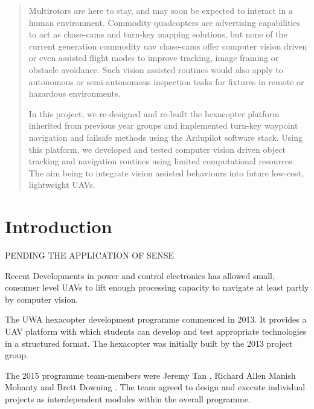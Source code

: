 \documentclass{article}
\begin{document}
  

  \begin{abstract}
  Multirotors are here to stay, and may soon be expected to interact in a human environment.
  Commodity quadcopters are advertising capabilities to act as  chase-cams and turn-key mapping solutions, but none of the current generation commodity uav chase-cams offer computer vision driven or even assisted flight modes to improve tracking, image framing or obstacle avoidance.  Such vision assisted routines would also apply to autonomous or semi-autonomous inspection tasks for fixtures in remote or hazardous environments.

  In this project, we re-designed and re-built the hexacopter platform inherited from previous year groups and implemented turn-key waypoint navigation and failsafe methods using the Ardupilot software stack.
  Using this platform, we developed and tested computer vision driven object tracking and navigation routines using limited computational resources. The aim  being to integrate vision assisted behaviours into future low-cost, lightweight UAVs.
  \end{abstract}
  \pagebreak
  \tableofcontents
  \pagebreak
  \section{Introduction}
    PENDING THE APPLICATION OF SENSE
    
    Recent Developments in power and control electronics has allowed small, consumer level UAVs to lift enough processing capacity to navigate at least partly by computer vision.
    
    The UWA hexacopter development programme commenced in 2013. It provides a UAV platform with which students can develop and test appropriate technologies in a structured format. The hexacopter was initially built by the 2013 project group.


    The 2015 programme team-members were Jeremy Tan \cite{Tan}, Richard Allen \cite{Allen} Manish Mohanty \cite{Mohanty} and Brett Downing \cite{Downing}.  The team agreed to design and execute individual projects as interdependent modules within the overall programme.
\end{document}
